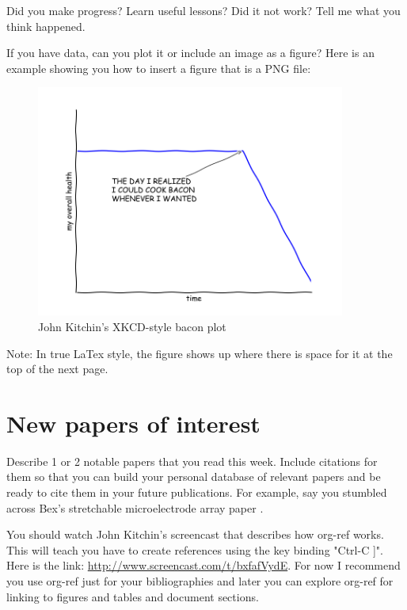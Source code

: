 \documentclass[11pt]{article}
\begin{document}
Did you make progress? Learn useful lessons? Did it not work? Tell me what you think happened.

If you have data, can you plot it or include an image as a figure? Here is an example showing you how to insert a figure that is a PNG file:

\begin{figure}[htbp]
\centering
\includegraphics[width=4in]{JohnKitchinBacon.png}
\caption{\label{fig:1}
John Kitchin's XKCD-style bacon plot}
\end{figure}

Note: In true LaTex style, the figure shows up where there is space for it at the top of the next page.

\section{New papers of interest}
\label{sec:orgdfbe2d6}

Describe 1 or 2 notable papers that you read this week. Include citations for them so that you can build your personal database of relevant papers and be ready to cite them in your future publications. For example, say you stumbled across Bex's stretchable microelectrode array paper \cite{Taylor2013JMM}.

You should watch John Kitchin's screencast that describes how org-ref works. This will teach you have to create references using the key binding "Ctrl-C ]". Here is the link: \url{http://www.screencast.com/t/bxfafVydE}. For now I recommend you use org-ref just for your bibliographies and later you can explore org-ref for linking to figures and tables and document sections.




\label{bibliography}
\end{document}
